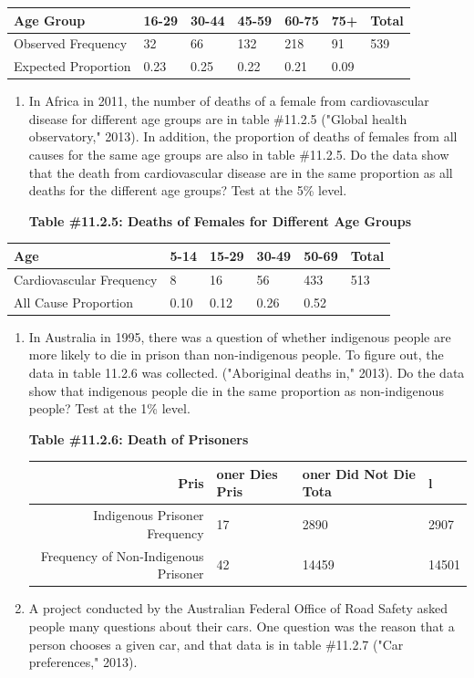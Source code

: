\documentclass[
]{book}
\begin{document}
\begin{longtable}[]{@{}lllllll@{}}
\toprule
Age Group & 16-29 & 30-44 & 45-59 & 60-75 & 75+ & Total\tabularnewline
\midrule
\endhead
Observed Frequency & 32 & 66 & 132 & 218 & 91 & 539\tabularnewline
Expected Proportion & 0.23 & 0.25 & 0.22 & 0.21 & 0.09 &\tabularnewline
\bottomrule
\end{longtable}

\begin{enumerate}
\def\labelenumi{\arabic{enumi}.}
\setcounter{enumi}{3}
\item
  In Africa in 2011, the number of deaths of a female from cardiovascular disease for different age groups are in table \#11.2.5 ("Global health observatory," 2013). In addition, the proportion of deaths of females from all causes for the same age groups are also in table \#11.2.5. Do the data show that the death from cardiovascular disease are in the same proportion as all deaths for the different age groups? Test at the 5\% level.

  \textbf{Table \#11.2.5: Deaths of Females for Different Age Groups}
\end{enumerate}

\begin{longtable}[]{@{}llllll@{}}
\toprule
Age & 5-14 & 15-29 & 30-49 & 50-69 & Total\tabularnewline
\midrule
\endhead
Cardiovascular Frequency & 8 & 16 & 56 & 433 & 513\tabularnewline
All Cause Proportion & 0.10 & 0.12 & 0.26 & 0.52 &\tabularnewline
\bottomrule
\end{longtable}

\begin{enumerate}
\def\labelenumi{\arabic{enumi}.}
\setcounter{enumi}{4}
\item
  In Australia in 1995, there was a question of whether indigenous people are more likely to die in prison than non-indigenous people. To figure out, the data in table 11.2.6 was collected. ("Aboriginal deaths in," 2013). Do the data show that indigenous people die in the same proportion as non-indigenous people? Test at the 1\% level.

  \textbf{Table \#11.2.6: Death of Prisoners}

  \begin{longtable}[]{@{}rlll@{}}
  \toprule
  Pris & oner Dies Pris & oner Did Not Die Tota & l\tabularnewline
  \midrule
  \endhead
  Indigenous Prisoner Frequency & 17 & 2890 & 2907\tabularnewline
  Frequency of Non-Indigenous Prisoner & 42 & 14459 & 14501\tabularnewline
  \bottomrule
  \end{longtable}
\item
  A project conducted by the Australian Federal Office of Road Safety asked people many questions about their cars. One question was the reason that a person chooses a given car, and that data is in table \#11.2.7 ("Car preferences," 2013).
\end{enumerate}
\end{document}
